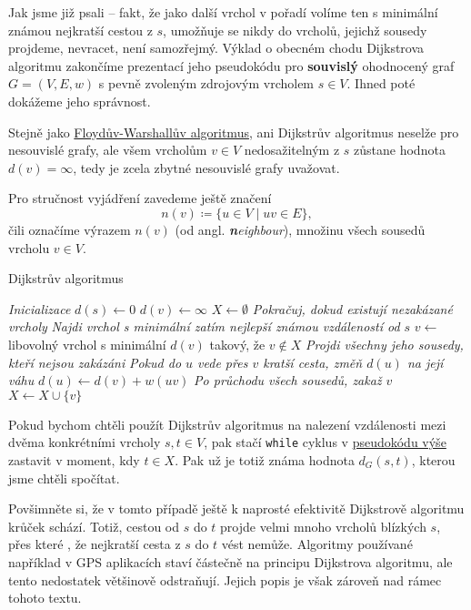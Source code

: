 Jak jsme již psali -- fakt, že jako další vrchol v pořadí volíme ten s minimální
známou nejkratší cestou z $s$, umožňuje se nikdy do vrcholů, jejichž sousedy
projdeme, nevracet, není samozřejmý. Výklad o obecném chodu Dijkstrova algoritmu
zakončíme prezentací jeho pseudokódu pro \textbf{souvislý} ohodnocený graf $G =
(V,E,w)$ s pevně zvoleným zdrojovým vrcholem $s \in V$. Ihned poté dokážeme jeho
správnost.

\begin{remark}
 Stejně jako \hyperref[alg:floyd-warshall]{Floydův-Warshallův algoritmus}, ani
 Dijkstrův  algoritmus neselže pro nesouvislé grafy, ale všem vrcholům $v \in V$
 nedosažitelným z $s$ zůstane hodnota $d(v) = \infty$, tedy je zcela zbytné
 nesouvislé grafy uvažovat.
\end{remark}

Pro stručnost vyjádření zavedeme ještě značení
\[
 n(v) \coloneqq \{u \in V \mid uv \in E\},
\]
čili označíme výrazem $n(v)$ (od angl. \emph{\textbf{n}eighbour}), množinu všech
sousedů vrcholu $v \in V$.

\begin{algorithm}
 \caption{Dijkstrův algoritmus}
 \label{alg:dijkstra}


 \BlankLine
 \emph{Inicializace}\;
 $d(s) \leftarrow 0$\;
  {
  $d(v) \leftarrow \infty$\;
 }
 $X \leftarrow \emptyset$\;
 \BlankLine
 \emph{Pokračuj, dokud existují nezakázané vrcholy}\;
  {
  \emph{Najdi vrchol s minimální zatím nejlepší známou vzdáleností od $s$}\;
  $v \leftarrow $ libovolný vrchol s minimální $d(v)$ takový, že $v \notin X$\;
  \emph{Projdi všechny jeho sousedy, kteří nejsou zakázáni}\;
   {
   \emph{Pokud do $u$ vede přes $v$ kratší cesta, změň $d(u)$ na její váhu}\;
    {
    $d(u) \leftarrow d(v) + w(uv)$\;
   }
  }
  \emph{Po průchodu všech sousedů, zakaž $v$}\;
  $X \leftarrow X \cup \{v\}$\;
 }
 \;
\end{algorithm}

\pagebreak

\begin{remark}
 Pokud bychom chtěli použít Dijkstrův algoritmus na nalezení vzdálenosti mezi
 dvěma konkrétními vrcholy $s,t \in V$, pak stačí \texttt{while} cyklus v
 \hyperref[alg:dijkstra]{pseudokódu výše} zastavit v moment, kdy $t \in X$. Pak
 už je totiž známa hodnota $d_G(s,t)$, kterou jsme chtěli spočítat.

 Povšimněte si, že v tomto případě ještě k naprosté efektivitě Dijkstro\-vě
 algoritmu krůček schází. Totiž, cestou od $s$ do $t$ projde velmi mnoho vrcholů
 blízkých $s$, přes které , že nejkratší cesta z $s$ do $t$ vést
 nemůže. Algoritmy používané například v GPS aplikacích staví částečně na
 principu Dijkstrova algoritmu, ale tento nedostatek většinově odstraňují.
 Jejich popis je však zároveň nad rámec tohoto textu.
\end{remark}

